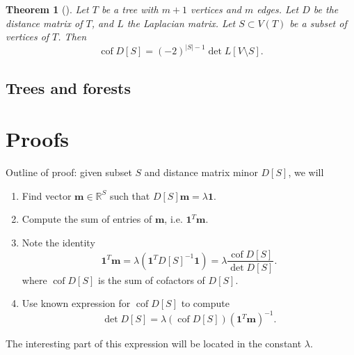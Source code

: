 \documentclass{amsart}
\newtheorem{thm}{Theorem}
\theoremstyle{definition}
\newcommand{\RR}{\mathbb{R}}
\DeclareMathOperator{\cof}{cof}
\begin{document}
\begin{thm}[\cite{bapat-sivasubramanian}]
Let $T$ be a tree with $m+1$ vertices and $m$ edges.
Let $D$ be the distance matrix of $T$, and $L$ the Laplacian matrix.
Let $S \subset V(T)$ be a subset of vertices of $T$. 
Then
\begin{equation*}
\cof D[S] = (-2)^{|S|-1} \det L[V \setminus S] .
\end{equation*}
\end{thm}

\subsection{Trees and forests}


\section{Proofs}

Outline of proof: given subset $S$ and distance matrix minor $D[S]$, we will
\begin{enumerate}
\item 
Find vector $\mathbf{m} \in \RR^S$ such that $D[S]\mathbf{m} = \lambda \mathbf{1}$.

\item 
Compute the sum of entries of $\mathbf{m}$, i.e. $\mathbf{1}^T\mathbf{m}$.

\item 
Note the identity
$$ \mathbf{1}^T \mathbf{m} 
= \lambda (\mathbf{1}^T D[S]^{-1} \mathbf{1}) 
= \lambda \frac{\cof D[S]}{\det D[S]} .$$
where $\cof D[S]$ is the sum of cofactors of $D[S]$.

\item 
Use known expression for $\cof D[S]$ to compute
$$
\det D[S] = \lambda (\cof D[S]) \left( \mathbf{1}^T \mathbf{m} \right)^{-1}.
$$
\end{enumerate}
The interesting part  of this expression will be located in the constant $\lambda$.
\end{document}
